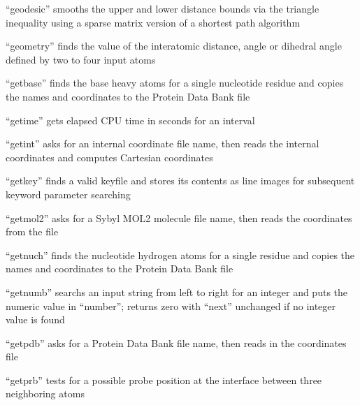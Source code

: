 \documentclass[letterpaper,11pt,english]{sphinxmanual}
\begin{document}

“geodesic” smooths the upper and lower distance bounds via the triangle inequality using a sparse matrix version of a shortest path algorithm


“geometry” finds the value of the interatomic distance, angle or dihedral angle defined by two to four input atoms


“getbase” finds the base heavy atoms for a single nucleotide residue and copies the names and coordinates to the Protein Data Bank file


“getime” gets elapsed CPU time in seconds for an interval


“getint” asks for an internal coordinate file name, then reads the internal coordinates and computes Cartesian coordinates


“getkey” finds a valid keyfile and stores its contents as line images for subsequent keyword parameter searching


“getmol2” asks for a Sybyl MOL2 molecule file name, then reads the coordinates from the file



“getnuch” finds the nucleotide hydrogen atoms for a single residue and copies the names and coordinates to the Protein Data Bank file


“getnumb” searchs an input string from left to right for an integer and puts the numeric value in “number”; returns zero with “next” unchanged if no integer value is found


“getpdb” asks for a Protein Data Bank file name, then reads in the coordinates file


“getprb” tests for a possible probe position at the interface between three neighboring atoms
\end{document}
